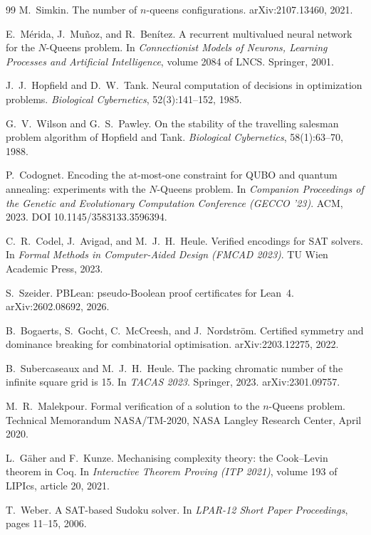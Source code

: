\documentclass{easychair}
\begin{document}
\begin{thebibliography}{99}
M.~Simkin.
\newblock The number of $n$-queens configurations.
\newblock arXiv:2107.13460, 2021.

E.~M\'{e}rida, J.~Mu\~{n}oz, and R.~Ben\'{i}tez.
\newblock A recurrent multivalued neural network for the $N$-Queens problem.
\newblock In \emph{Connectionist Models of Neurons, Learning Processes and Artificial Intelligence},
volume 2084 of LNCS. Springer, 2001.

J.~J.~Hopfield and D.~W.~Tank.
\newblock Neural computation of decisions in optimization problems.
\newblock \emph{Biological Cybernetics}, 52(3):141--152, 1985.

G.~V.~Wilson and G.~S.~Pawley.
\newblock On the stability of the travelling salesman problem algorithm of Hopfield and Tank.
\newblock \emph{Biological Cybernetics}, 58(1):63--70, 1988.

P.~Codognet.
\newblock Encoding the at-most-one constraint for QUBO and quantum annealing: experiments with the
$N$-Queens problem.
\newblock In \emph{Companion Proceedings of the Genetic and Evolutionary Computation Conference
(GECCO '23)}. ACM, 2023. DOI 10.1145/3583133.3596394.

C.~R.~Codel, J.~Avigad, and M.~J.~H.~Heule.
\newblock Verified encodings for SAT solvers.
\newblock In \emph{Formal Methods in Computer-Aided Design (FMCAD 2023)}. TU Wien Academic Press, 2023.

S.~Szeider.
\newblock PBLean: pseudo-Boolean proof certificates for Lean~4.
\newblock arXiv:2602.08692, 2026.

B.~Bogaerts, S.~Gocht, C.~McCreesh, and J.~Nordstr\"{o}m.
\newblock Certified symmetry and dominance breaking for combinatorial optimisation.
\newblock arXiv:2203.12275, 2022.

B.~Subercaseaux and M.~J.~H.~Heule.
\newblock The packing chromatic number of the infinite square grid is 15.
\newblock In \emph{TACAS 2023}. Springer, 2023. arXiv:2301.09757.

M.~R.~Malekpour.
\newblock Formal verification of a solution to the $n$-Queens problem.
\newblock Technical Memorandum NASA/TM-2020, NASA Langley Research Center, April 2020.

L.~G\"{a}her and F.~Kunze.
\newblock Mechanising complexity theory: the Cook--Levin theorem in Coq.
\newblock In \emph{Interactive Theorem Proving (ITP 2021)}, volume 193 of LIPIcs, article 20, 2021.

T.~Weber.
\newblock A SAT-based Sudoku solver.
\newblock In \emph{LPAR-12 Short Paper Proceedings}, pages 11--15, 2006.

\end{thebibliography}
\end{document}
